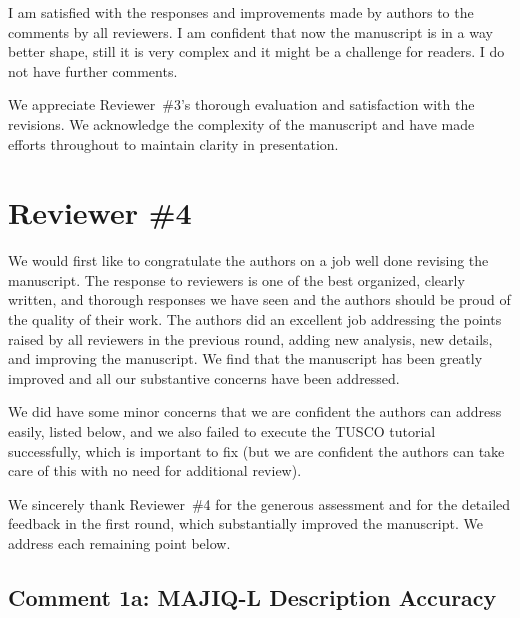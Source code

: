 \documentclass[11pt]{article}
\begin{document}
\begin{positiveremarks}
I am satisfied with the responses and improvements made by authors to the comments by all reviewers. I am confident that now the manuscript is in a way better shape, still it is very complex and it might be a challenge for readers. I do not have further comments.
\end{positiveremarks}

\begin{responseboxnew}
We appreciate Reviewer~\#3's thorough evaluation and satisfaction with the revisions. We acknowledge the complexity of the manuscript and have made efforts throughout to maintain clarity in presentation.
\end{responseboxnew}

\section{Reviewer \#4}

\begin{positiveremarks}
We would first like to congratulate the authors on a job well done revising the manuscript. The response to reviewers is one of the best organized, clearly written, and thorough responses we have seen and the authors should be proud of the quality of their work. The authors did an excellent job addressing the points raised by all reviewers in the previous round, adding new analysis, new details, and improving the manuscript. We find that the manuscript has been greatly improved and all our substantive concerns have been addressed.

\vspace{0.2cm}
We did have some minor concerns that we are confident the authors can address easily, listed below, and we also failed to execute the TUSCO tutorial successfully, which is important to fix (but we are confident the authors can take care of this with no need for additional review).
\end{positiveremarks}

\begin{responseboxnew}
We sincerely thank Reviewer~\#4 for the generous assessment and for the detailed feedback in the first round, which substantially improved the manuscript. We address each remaining point below.
\end{responseboxnew}

\subsection{Comment 1a: MAJIQ-L Description Accuracy}
\end{document}
